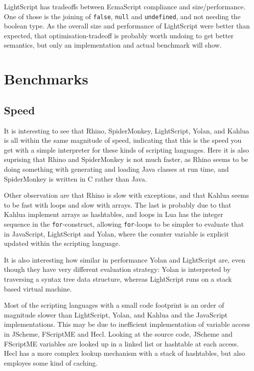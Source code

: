 \documentclass[11pt]{report}
\begin{document}
LightScript has tradeoffs between EcmaScript compliance and size/performance. 
One of those is the joining of \verb|false|, \verb|null| and \verb|undefined|, and not needing the boolean type.
As the overall size and performance of LightScript were better than expected,
that optimisation-tradeoff is probably worth undoing to get better semantics, 
but only an implementation and actual benchmark will show. 

\section{Benchmarks}
\subsection{Speed}

It is interesting to see that Rhino, SpiderMonkey, LightScript, Yolan, and Kahlua is all within the same magnitude of speed, indicating that this is the speed you get with a simple interpreter for these kinds of scripting languages. Here it is also suprising that Rhino and SpiderMonkey is not much faster, as Rhino seems to be doing something with generating and loading Java classes at run time, and SpiderMonkey is written in C rather than Java.

Other observation are that Rhino is slow with exceptions, and that Kahlua seems to be fast with loops and slow with arrays. The last is probably due to that Kahlua implement arrays as hashtables, and loops in Lua has the integer sequence in the \verb|for|-construct, allowing \verb|for|-loops to be simpler to evaluate that in JavaScript, LightScript and Yolan, where the counter variable is explicit updated within the scripting language.

It is also interesting how similar in performance Yolan and LightScript are, even though they have very different evaluation strategy: Yolan is interpreted by traversing a syntax tree data structure, whereas LightScript runs on a stack based virtual machine. 

Most of the scripting languages with a small code footprint is an order of magnitude slower than LightScript, Yolan, and Kahlua and the JavaScript implementations.
This may be due to inefficient implementation of variable access in JScheme, FScriptME and Hecl. Looking at the source code, JScheme and FScriptME variables are looked up in a linked list or hashtable at each access. Hecl has a more complex lookup mechanism with a stack of hashtables, but also employes some kind of caching.
\end{document}
